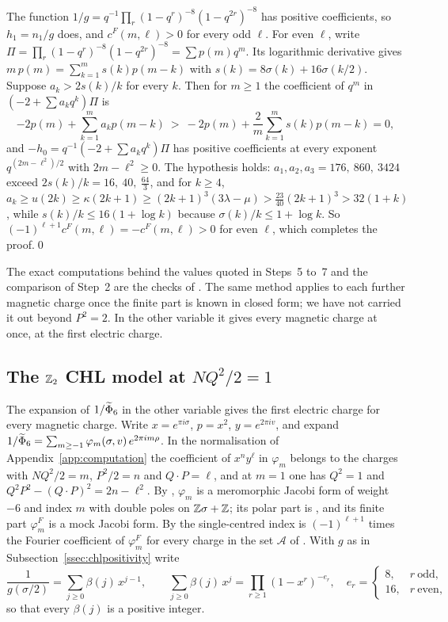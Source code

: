  The function $1/g=q^{-1}\prod_r(1-q^r)^{-8}(1-q^{2r})^{-8}$ has positive coefficients, so $h_1=n_1/g$ does, and $c^F(m,\ell)>0$ for every odd $\ell$. For even $\ell$, write $\Pi=\prod_r(1-q^r)^{-8}(1-q^{2r})^{-8}=\sum p(m)q^m$. Its logarithmic derivative gives $m\,p(m)=\sum_{k=1}^m s(k)p(m-k)$ with $s(k)=8\sigma(k)+16\sigma(k/2)$. Suppose $a_k>2s(k)/k$ for every $k$. Then for $m\ge1$ the coefficient of $q^m$ in $(-2+\sum a_kq^k)\Pi$ is
\[
-2p(m)+\sum_{k=1}^ma_kp(m-k)\ >\ -2p(m)+\frac2m\sum_{k=1}^m s(k)p(m-k)=0,
\]
and $-h_0=q^{-1}(-2+\sum a_kq^k)\Pi$ has positive coefficients at every exponent $q^{(2m-\ell^2)/2}$ with $2m-\ell^2\ge0$. The hypothesis holds: $a_1,a_2,a_3=176,\ 860,\ 3424$ exceed $2s(k)/k=16,\ 40,\ \tfrac{64}{3}$, and for $k\ge4$, $a_k\ge u(2k)\ge\kappa(2k+1)\ge(2k+1)^3(3\lambda-\mu)>\tfrac{23}{40}(2k+1)^3>32(1+k)$, while $s(k)/k\le16(1+\log k)$ because $\sigma(k)/k\le1+\log k$. So $(-1)^{\ell+1}c^F(m,\ell)=-c^F(m,\ell)>0$ for even $\ell$, which completes the proof.\qed

\smallskip
The exact computations behind the values quoted in Steps~5 to~7 and the comparison of Step~2 are the checks of \cite{Bha26}. The same method applies to each further magnetic charge once the finite part is known in closed form; we have not carried it out beyond $P^2=2$. In the other variable it gives every magnetic charge at once, at the first electric charge.

\subsection{The \texorpdfstring{$\mathbb{Z}_2$}{Z2} CHL model at \texorpdfstring{$NQ^2/2=1$}{NQ2/2=1}}\label{ssec:chlunit}

The expansion of $1/\widetilde{\Phi}_6$ in the other variable gives the first electric charge for every magnetic charge. Write $x=e^{\pi i\sigma}$, $p=x^2$, $y=e^{2\pi iv}$, and expand $1/\widetilde{\Phi}_6=\sum_{m\ge-1}\varphi_m(\sigma,v)\,e^{2\pi im\rho}$. In the normalisation of Appendix~\ref{app:computation} the coefficient of $x^ny^\ell$ in $\varphi_m$ belongs to the charges with $NQ^2/2=m$, $P^2/2=n$ and $Q\cdot P=\ell$, and at $m=1$ one has $Q^2=1$ and $Q^2P^2-(Q\cdot P)^2=2n-\ell^2$. By \cite[Theorem~5.2]{BSS25}, $\varphi_m$ is a meromorphic Jacobi form of weight $-6$ and index $m$ with double poles on $\mathbb{Z}\sigma+\mathbb{Z}$; its polar part is \cite[(5.45)]{BSS25}, and its finite part $\varphi^F_m$ is a mock Jacobi form. By \cite[Theorem~5.4(a)]{BSS25} the single-centred index is $(-1)^{\ell+1}$ times the Fourier coefficient of $\varphi^F_m$ for every charge in the set $\mathcal A$ of \cite[(5.46)--(5.47)]{BSS25}. With $g$ as in Subsection~\ref{ssec:chlpositivity} write
\[
\frac1{g(\sigma/2)}=\sum_{j\ge0}\beta(j)\,x^{j-1},\qquad \sum_{j\ge0}\beta(j)\,x^j=\prod_{r\ge1}(1-x^r)^{-e_r},\quad e_r=\begin{cases}8,& r\ \text{odd},\\ 16,& r\ \text{even},\end{cases}
\]
so that every $\beta(j)$ is a positive integer.

